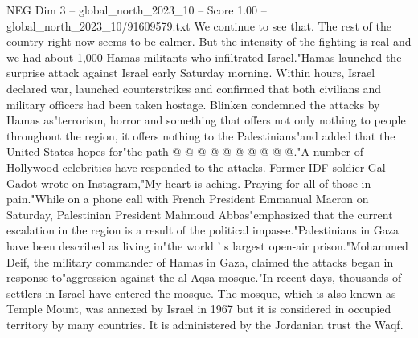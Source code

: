 \begin{textsample}{NEG Dim 3 – global\_north\_2023\_10 – Score 1.00 – global\_north\_2023\_10/91609579.txt}
We continue to see that.
The rest of the country right now seems to be calmer.
But the intensity of the fighting is real and we had about 1,000 Hamas militants who infiltrated Israel."Hamas launched the surprise attack against Israel early Saturday morning.
Within hours, Israel declared war, launched counterstrikes and confirmed that both civilians and military officers had been taken hostage.
Blinken condemned the attacks by Hamas as"terrorism, horror and something that offers not only nothing to people throughout the region, it offers nothing to the Palestinians"and added that the United States hopes for"the path @ @ @ @ @ @ @ @ @ @."A number of Hollywood celebrities have responded to the attacks.
Former IDF soldier Gal Gadot wrote on Instagram,"My heart is aching.
Praying for all of those in pain."While on a phone call with French President Emmanual Macron on Saturday, Palestinian President Mahmoud Abbas"emphasized that the current escalation in the region is a result of the political impasse."Palestinians in Gaza have been described as living in"the world ' s largest open-air prison."Mohammed Deif, the military commander of Hamas in Gaza, claimed the attacks began in response to"aggression against the al-Aqsa mosque."In recent days, thousands of settlers in Israel have entered the mosque.
The mosque, which is also known as Temple Mount, was annexed by Israel in 1967 but it is considered in occupied territory by many countries.
It is administered by the Jordanian trust the Waqf.

\end{textsample}
